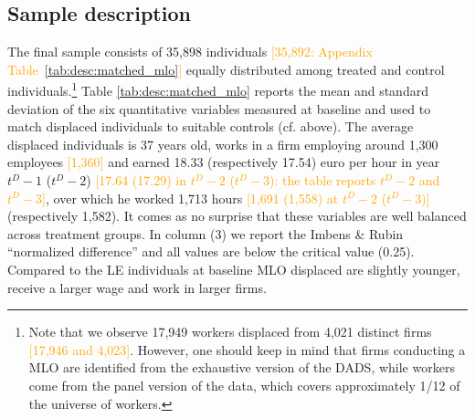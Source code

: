 \subsection{Sample description}
The final sample consists of 35,898 individuals \textcolor{orange}{[35,892: Appendix Table~\ref{tab:desc:matched_mlo}]} equally distributed among treated and control individuals.\footnote{Note that we observe 17,949 workers displaced from 4,021 distinct firms \textcolor{orange}{[17,946 and 4,023]}. However, one should keep in mind that firms conducting a MLO are identified from the exhaustive version of the DADS, while workers come from the panel version of the data, which covers approximately  1/12 of the universe of workers.} Table \ref{tab:desc:matched_mlo} reports the mean and standard deviation of the six quantitative variables measured at baseline and used to match displaced individuals to suitable controls (cf. above). The average displaced individuals is 37 years old, works in a firm employing around 1,300 employees \textcolor{orange}{[1,360]} and earned 18.33 (respectively 17.54) euro per hour in year $t^D-1$ ($t^D-2$) \textcolor{orange}{[17.64 (17.29) in $t^D-2$ ($t^D-3$): the table reports $t^D-2$ and $t^D-3$]}, over which he worked 1,713 hours \textcolor{orange}{[1,691 (1,558) at $t^D-2$ ($t^D-3$)]} (respectively 1,582). It comes as no surprise that these variables are well balanced across treatment groups. In column (3) we report the Imbens \& Rubin ``normalized difference'' and all values are below the critical value (0.25). Compared to the LE individuals at baseline MLO displaced are slightly younger, receive a larger wage and work in larger firms.

